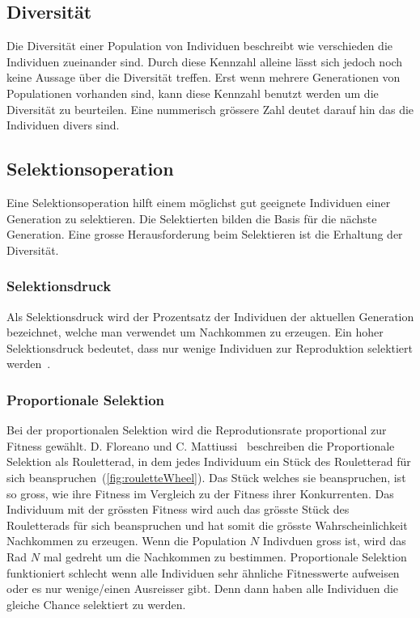     \subsection{Diversität\label{sub:diversity}}

      Die Diversität einer Population von Individuen beschreibt wie verschieden die Individuen zueinander sind.
      Durch diese Kennzahl alleine lässt sich jedoch noch keine Aussage über die Diversität treffen.
      Erst wenn mehrere Generationen von Populationen vorhanden sind, kann diese Kennzahl benutzt werden um die Diversität zu beurteilen.
      Eine nummerisch grössere Zahl deutet darauf hin das die Individuen divers sind.

    \subsection{Selektionsoperation}

      Eine Selektionsoperation hilft einem möglichst gut geeignete Individuen einer Generation zu selektieren.
      Die Selektierten bilden die Basis für die nächste Generation.
      Eine grosse Herausforderung beim Selektieren ist die Erhaltung der Diversität.

      \subsubsection{Selektionsdruck}

        Als Selektionsdruck wird der Prozentsatz der Individuen der aktuellen Generation bezeichnet,
        welche man verwendet um Nachkommen zu erzeugen.
        Ein hoher Selektionsdruck bedeutet,
        dass nur wenige Individuen zur Reproduktion selektiert werden~\cite[S.23]{book:bioInspired}.

      \subsubsection{Proportionale Selektion}

        Bei der proportionalen Selektion wird die Reprodutionsrate proportional zur Fitness gewählt.
        D. Floreano und C. Mattiussi~\cite[S.23]{book:bioInspired} beschreiben die Proportionale Selektion als Rouletterad,
        in dem jedes Individuum ein Stück des Rouletterad für sich beanspruchen~(\vref{fig:rouletteWheel}).
        Das Stück welches sie beanspruchen, ist so gross, wie ihre Fitness im Vergleich zu der Fitness ihrer Konkurrenten.
        Das Individuum mit der grössten Fitness wird auch das grösste Stück des Rouletterads für sich beanspruchen und hat somit die grösste Wahrscheinlichkeit Nachkommen zu erzeugen.
        Wenn die Population \(N\) Indivduen gross ist, wird das Rad \(N\) mal gedreht um die Nachkommen zu bestimmen.
        Proportionale Selektion funktioniert schlecht wenn alle Individuen sehr ähnliche Fitnesswerte aufweisen oder es nur wenige/einen Ausreisser gibt.
        Denn dann haben alle Individuen die gleiche Chance selektiert zu werden.

